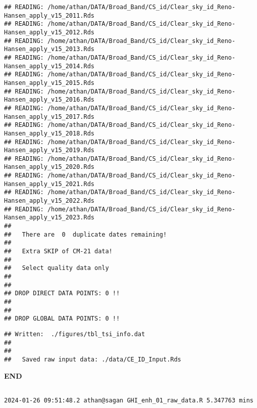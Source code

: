 \documentclass[
  10pt,
  a4paper,oneside]{article}
\begin{document}
\begin{verbatim}
## READING: /home/athan/DATA/Broad_Band/CS_id/Clear_sky_id_Reno-Hansen_apply_v15_2011.Rds 
## READING: /home/athan/DATA/Broad_Band/CS_id/Clear_sky_id_Reno-Hansen_apply_v15_2012.Rds 
## READING: /home/athan/DATA/Broad_Band/CS_id/Clear_sky_id_Reno-Hansen_apply_v15_2013.Rds 
## READING: /home/athan/DATA/Broad_Band/CS_id/Clear_sky_id_Reno-Hansen_apply_v15_2014.Rds 
## READING: /home/athan/DATA/Broad_Band/CS_id/Clear_sky_id_Reno-Hansen_apply_v15_2015.Rds 
## READING: /home/athan/DATA/Broad_Band/CS_id/Clear_sky_id_Reno-Hansen_apply_v15_2016.Rds 
## READING: /home/athan/DATA/Broad_Band/CS_id/Clear_sky_id_Reno-Hansen_apply_v15_2017.Rds 
## READING: /home/athan/DATA/Broad_Band/CS_id/Clear_sky_id_Reno-Hansen_apply_v15_2018.Rds 
## READING: /home/athan/DATA/Broad_Band/CS_id/Clear_sky_id_Reno-Hansen_apply_v15_2019.Rds 
## READING: /home/athan/DATA/Broad_Band/CS_id/Clear_sky_id_Reno-Hansen_apply_v15_2020.Rds 
## READING: /home/athan/DATA/Broad_Band/CS_id/Clear_sky_id_Reno-Hansen_apply_v15_2021.Rds 
## READING: /home/athan/DATA/Broad_Band/CS_id/Clear_sky_id_Reno-Hansen_apply_v15_2022.Rds 
## READING: /home/athan/DATA/Broad_Band/CS_id/Clear_sky_id_Reno-Hansen_apply_v15_2023.Rds 
## 
##   There are  0  duplicate dates remaining!
## 
##   Extra SKIP of CM-21 data!
## 
##   Select quality data only
## 
## 
## DROP DIRECT DATA POINTS: 0 !!
## 
## 
## DROP GLOBAL DATA POINTS: 0 !!
\end{verbatim}

\begin{verbatim}
## Written:  ./figures/tbl_tsi_info.dat 
## 
## 
##   Saved raw input data: ./data/CE_ID_Input.Rds
\end{verbatim}

\textbf{END}

\begin{verbatim}

2024-01-26 09:51:48.2 athan@sagan GHI_enh_01_raw_data.R 5.347763 mins
\end{verbatim}
\end{document}
